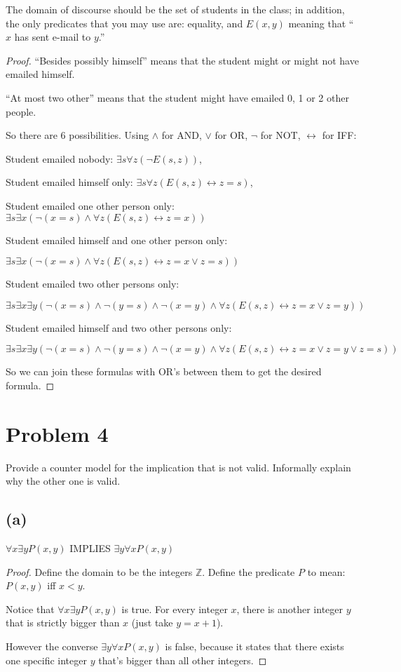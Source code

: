 \documentclass[14pt]{extarticle}
\begin{document}
The domain of discourse should be the set of students in the class; in addition, the only predicates that you may use are: equality, and $E(x, y)$ meaning that “$x$ has sent e-mail to $y$.”
\begin{proof}
    ``Besides possibly himself'' means that the student might or might not have emailed himself.

    ``At most two other'' means that the student might have emailed 0, 1 or 2 other people.

    So there are 6 possibilities. Using $\wedge$ for AND, $\vee$ for OR, $\neg$ for NOT, $\leftrightarrow$ for IFF:

    Student emailed nobody: $\exists s \forall z (\neg E(s,z))$,

    Student emailed himself only: $\exists s \forall z (E(s,z) \leftrightarrow z = s)$,

    Student emailed one other person only: $\exists s \exists x (\neg(x = s) \wedge \forall z (E(s,z) \leftrightarrow z = x))$

    Student emailed himself and one other person only:

    $\exists s \exists x (\neg(x = s) \wedge \forall z (E(s,z) \leftrightarrow z = x \vee z = s))$

    Student emailed two other persons only:

    $\exists s \exists x \exists y (\neg(x = s) \wedge \neg(y = s) \wedge \neg(x = y) \wedge \forall z (E(s,z) \leftrightarrow z = x \vee z = y))$

    Student emailed himself and two other persons only:

    $\exists s \exists x \exists y (\neg(x = s) \wedge \neg(y = s) \wedge \neg(x = y) \wedge \forall z (E(s,z) \leftrightarrow z = x \vee z = y \vee z = s))$

    So we can join these formulas with OR's between them to get the desired formula.
\end{proof}

\section{Problem 4}
Provide a counter model for the implication that is not valid. Informally explain why the other one is valid.

\subsection{(a)}
$\forall x \exists y P(x, y)$ IMPLIES $\exists y \forall x P(x, y)$
\begin{proof}
    Define the domain to be the integers $\mathbb{Z}$. Define the predicate $P$ to mean: $P(x, y)$ iff $x < y$.

    Notice that $\forall x \exists y P(x, y)$ is true. For every integer $x$, there is another integer $y$ that is strictly bigger than $x$ (just take $y = x+1$).

    However the converse $\exists y \forall x P(x, y)$ is false, because it states that there exists one specific integer $y$ that's bigger than all other integers.
\end{proof}
\end{document}
